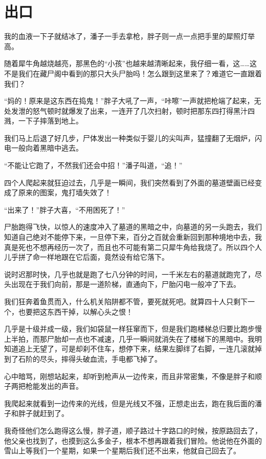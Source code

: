 \chapter{出口}

我的血液一下子就结冰了，潘子一手去拿枪，胖子则一点一点把手里的犀照灯举高。

随着犀牛角越烧越亮，那黑色的“小孩”也越来越清晰起来，我仔细一看，这……这不是我们在藏尸阁中看到的那只大头尸胎吗！怎么跟到这里来了？难道它一直跟着我们？

“妈的！原来是这东西在捣鬼！”胖子大吼了一声，“咔嚓”一声就把枪端了起来，无处发泄的怒气顿时就爆发了出来，一连开了几次扫射，顿时把那东四打得黑汁四溅，一下子摔落到地上。

我们马上后退了好几步，尸体发出一种类似于婴儿的尖叫声，猛撞翻了无烟炉，闪电一般向着黑暗中逃去。

“不能让它跑了，不然我们还会中招！”潘子叫道，“追！”

四个人爬起来就狂迫过去，几乎是一瞬间，我们突然看到了外面的墓道壁画已经变成了原来的图案，鬼打墙失效了！

“出来了！”胖子大喜，“不用困死了！”

尸胎跑得飞快，以惊人的速度冲入了墓道的黑暗之中，向墓道的另一头跑去，我们知道自己绝对不能停下来，一旦停下来，百分之百就会重新回到那种境地中去，我真是死也不想再经历一次了，而且也不可能有第二只犀牛角给我烧了。所以四个人儿乎拼了命一样地跟在它后面，竟然设有给它落下。

说时迟那时快，几乎也就是跑了七八分钟的时间，一千米左右的墓道就跑完了，尽头出现在于我们向前，那是一道阶梯，直通向下，尸胎闪电一般冲了下去。

我们狂奔着鱼贯而入，什么机关陷阱都不管，要死就死吧。就算四十人只剩下一个，也要把这东西干掉，以解心头之恨！

几乎是十级并成一级，我们如袋鼠一样狂窜而下，但是我们跑楼梯总归要比跑步慢上半拍，而那尸胎却一点也不减速，几乎一瞬间就消失在了楼梯下的黑暗中。我明知道追上无望了，可是却刹不住车，想停下来，结果左脚绊了右脚，一连几滚就掉到了石阶的尽头，摔得头破血流，手电都飞掉了。

心中暗骂，刚想站起来，却听到枪声从一边传来，而且非常密集，不像是胖子和顺子两把枪能发出的声音。

我爬起来就看到一边传来的光线，但是光线又不强，正想走出去，跑在我后面的潘子和胖子就赶到了。

我奇怪他们怎么跑得这么慢，胖子道，顺子路过十字路口的时候，按原路回去了，他父亲也找到了，也摸到这么多金子，根本不想再跟着我们冒险。他说他在外面的雪山上等我们一个星期，如果一个星期后我们还不出来，他就自己回去了。

